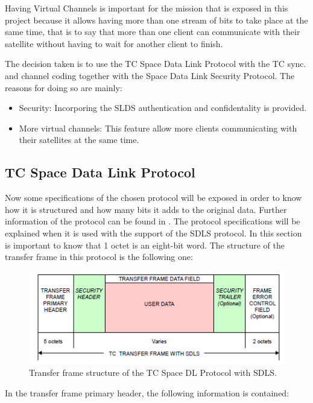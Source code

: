 Having Virtual Channels is important for the mission that is exposed in this project because it allows having more than one stream of bits to take place at the same time, that is to say that more than one client can communicate with their satellite without having to wait for another client to finish.

The decision taken is to use the TC Space Data Link Protocol with the TC sync. and channel coding together with the Space Data Link Security Protocol. The reasons for doing so are mainly:

\begin{itemize}
\item Security: Incorporing the SLDS authentication and confidentality is provided.
\item More virtual channels: This feature allow more clients communicating with their satellites at the same time.
\end{itemize}

\subsection{TC Space Data Link Protocol}
Now some specifications of the chosen protocol will be exposed in order to know how it is structured and how many bits it adds to the original data. Further information of the protocol can be found in \cite{CCSDS2010}. The protocol specifications will be explained when it is used with the support of the SDLS protocol. In this section is important to know that 1 octet is an eight-bit word. The structure of the transfer frame in this protocol is the following one:
 
\begin{figure}[H]
\begin{center}
\includegraphics[scale=1]{transferfram.PNG}    
\caption{Transfer frame structure of the TC Space DL Protocol with SDLS.}
\end{center}
\end{figure}  

In the transfer frame primary header, the following information is contained:

